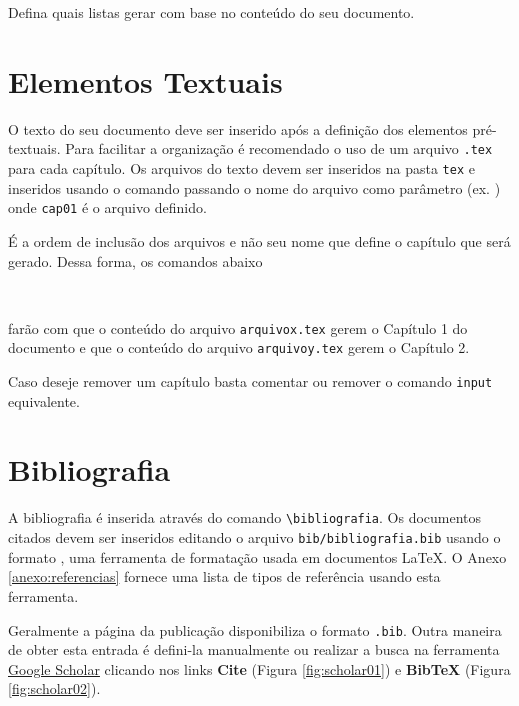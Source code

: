 Defina quais listas gerar com base no conteúdo do seu documento.

\section{Elementos Textuais}
\label{sec:textuais}

O texto do seu documento deve ser inserido após a definição dos elementos pré-textuais. Para facilitar a organização é recomendado o uso de um arquivo \verb|.tex| para cada capítulo. Os arquivos do texto devem ser inseridos na pasta \verb|tex| e inseridos usando o comando \verb|| passando o nome do arquivo como parâmetro (ex. \verb||) onde \verb|cap01| é o arquivo definido.

É a ordem de inclusão dos arquivos e não seu nome que define o capítulo que será gerado. Dessa forma, os comandos abaixo

\begin{Verbatim}


\end{Verbatim}

farão com que o conteúdo do arquivo \verb|arquivox.tex| gerem o Capítulo 1 do documento e que o conteúdo do arquivo \verb|arquivoy.tex| gerem o Capítulo 2. 

Caso deseje remover um capítulo basta comentar ou remover o comando \verb|input| equivalente.

\section{Bibliografia}
\label{sec:bib}

A bibliografia é inserida através do comando \verb|\bibliografia|. Os documentos citados devem ser inseridos editando o arquivo \verb|bib/bibliografia.bib| usando o formato \BibTeX, uma ferramenta de formatação usada em documentos \LaTeX. O Anexo \ref{anexo:referencias} fornece uma lista de tipos de referência usando esta ferramenta. 

Geralmente a página da publicação disponibiliza o formato \verb|.bib|. Outra maneira de obter esta entrada é defini-la manualmente ou realizar a busca na ferramenta \href{https://scholar.google.com}{Google Scholar} clicando nos links \textbf{Cite} (Figura \ref{fig:scholar01}) e \textbf{BibTeX} (Figura \ref{fig:scholar02}). 

